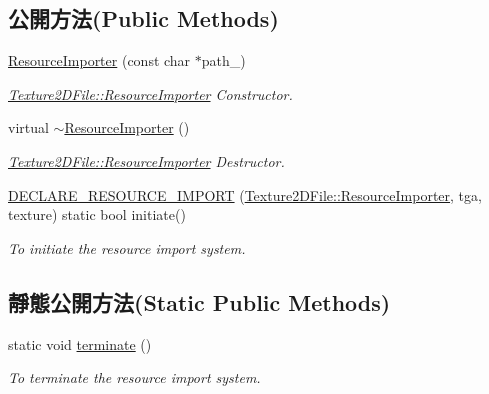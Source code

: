\subsection*{公開方法(Public Methods)}
\begin{DoxyCompactItemize}
\item 
\hyperlink{class_magnum_1_1_texture2_d_file_1_1_resource_importer_a83640b13ea6eac6e43ee515985bd03aa}{Resource\+Importer} (const char $\ast$path\+\_\+)
\begin{DoxyCompactList}\small\item\em \hyperlink{class_magnum_1_1_texture2_d_file_1_1_resource_importer}{Texture2\+D\+File\+::\+Resource\+Importer} Constructor. \end{DoxyCompactList}\item 
virtual \hyperlink{class_magnum_1_1_texture2_d_file_1_1_resource_importer_a526fa82e833ff825bc7ec29ff2af7243}{$\sim$\+Resource\+Importer} ()
\begin{DoxyCompactList}\small\item\em \hyperlink{class_magnum_1_1_texture2_d_file_1_1_resource_importer}{Texture2\+D\+File\+::\+Resource\+Importer} Destructor. \end{DoxyCompactList}\item 
\hyperlink{class_magnum_1_1_texture2_d_file_1_1_resource_importer_a859641728a656f42f92a7fb5dae27177}{D\+E\+C\+L\+A\+R\+E\+\_\+\+R\+E\+S\+O\+U\+R\+C\+E\+\_\+\+I\+M\+P\+O\+RT} (\hyperlink{class_magnum_1_1_texture2_d_file_1_1_resource_importer}{Texture2\+D\+File\+::\+Resource\+Importer}, tga, texture) static bool initiate()\hypertarget{class_magnum_1_1_texture2_d_file_1_1_resource_importer_a859641728a656f42f92a7fb5dae27177}{}\label{class_magnum_1_1_texture2_d_file_1_1_resource_importer_a859641728a656f42f92a7fb5dae27177}

\begin{DoxyCompactList}\small\item\em To initiate the resource import system. \end{DoxyCompactList}\end{DoxyCompactItemize}
\subsection*{靜態公開方法(Static Public Methods)}
\begin{DoxyCompactItemize}
\item 
static void \hyperlink{class_magnum_1_1_texture2_d_file_1_1_resource_importer_a01cfa5f495afea04a06380c0fa87978b}{terminate} ()\hypertarget{class_magnum_1_1_texture2_d_file_1_1_resource_importer_a01cfa5f495afea04a06380c0fa87978b}{}\label{class_magnum_1_1_texture2_d_file_1_1_resource_importer_a01cfa5f495afea04a06380c0fa87978b}

\begin{DoxyCompactList}\small\item\em To terminate the resource import system. \end{DoxyCompactList}\end{DoxyCompactItemize}
